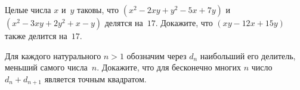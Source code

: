 \begin{problems}

\item
Целые числа $x$ и~$y$ таковы, что $(x^2 - 2 x y + y^2 - 5 x + 7 y)$
и~$(x^2 - 3 x y + 2 y^2 + x - y)$ делятся на~$17$.
Докажите, что $(x y - 12 x + 15 y)$ также делится на~$17$.


\item
Для каждого натурального $n > 1$ обозначим через $d_{n}$ наибольший его
делитель, меньший самого числа~$n$.
Докажите, что для бесконечно многих $n$ число $d_{n} + d_{n+1}$ является
точным квадратом.


\end{problems}

